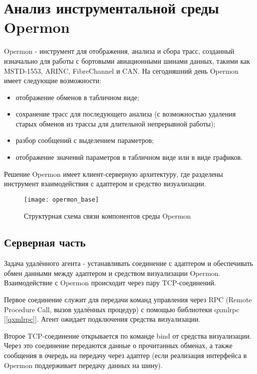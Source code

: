 \section{Анализ инструментальной среды Opermon}

Opermon - инструмент для отображения, анализа и сбора трасс, созданный изначально для работы с бортовыми авиационными шинами данных, такими как MSTD-1553, ARINC, FibreChannel и CAN. На сегодняшний день Opermon имеет следующие возможности:

\begin{itemize}
 \item отображение обменов в табличном виде;
 \item сохранение трасс для последующего анализа (с возможностью удаления старых обменов из трассы для длительной непрерывной работы);
 \item разбор сообщений с выделением параметров;
 \item отображение значений параметров в табличном виде или в виде графиков.
\end{itemize}

Решение Opermon имеет клиент-серверную архитектуру, где разделены инструмент взаимодействия с адаптером и средство визуализации. 

\begin{figure}[H]
 \centering
 \texttt{[image: opermon\_base]}
 \caption{Структурная схема связи компонентов среды Opermon}
 \label{fig:opermon_base}
\end{figure}

\subsection{Серверная часть}

\label{agent_base}

Задача удалённого агента - устанавливать соединение с адаптером и обеспечивать обмен данными между адаптером и средством визуализации Opermon. Взаимодействие с Opermon происходит через пару TCP-соединений.

Первое соединение служит для передачи команд управления через RPC (Remote Procedure Call, вызов удалённых процедур) с помощью библиотеки qxmlrpc [\ref{qxmlrpc}]. Агент ожидает подключения средства визуализации.

Второе TCP-соединение открывается по команде bind от средства визуализации. Через это соединение передаются данные о прочитанных обменах, а также сообщения в очередь на передачу через адаптер (если реализация интерфейса в Opermon поддерживает передачу данных на шину).

